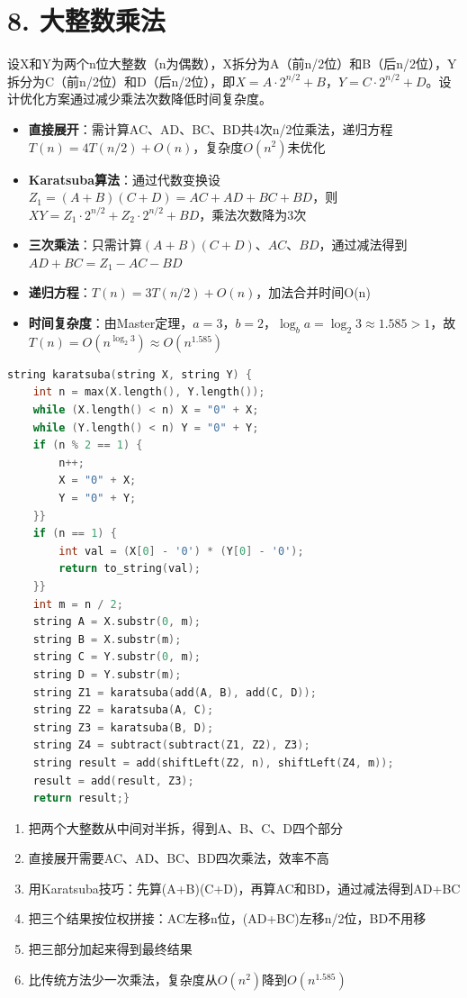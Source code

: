 \section*{8. 大整数乘法}
设X和Y为两个n位大整数（n为偶数），X拆分为A（前n/2位）和B（后n/2位），Y拆分为C（前n/2位）和D（后n/2位），即$X=A \cdot 2^{n/2}+B$，$Y=C \cdot 2^{n/2}+D$。设计优化方案通过减少乘法次数降低时间复杂度。
\begin{itemize}
    \item \textbf{直接展开}：需计算AC、AD、BC、BD共4次n/2位乘法，递归方程$T(n)=4T(n/2)+O(n)$，复杂度$O(n^2)$未优化
    \item \textbf{Karatsuba算法}：通过代数变换设$Z_1=(A+B)(C+D)=AC+AD+BC+BD$，则$XY=Z_1 \cdot 2^{n/2}+Z_2 \cdot 2^{n/2}+BD$，乘法次数降为3次
    \item \textbf{三次乘法}：只需计算$(A+B)(C+D)$、$AC$、$BD$，通过减法得到$AD+BC=Z_1-AC-BD$
    \item \textbf{递归方程}：$T(n)=3T(n/2)+O(n)$，加法合并时间O(n)
    \item \textbf{时间复杂度}：由Master定理，$a=3$，$b=2$，$\log_b a=\log_2 3 \approx 1.585>1$，故$T(n)=O(n^{\log_2 3}) \approx O(n^{1.585})$
\end{itemize}
\begin{lstlisting}[language=C++, style=cppstyle]
string karatsuba(string X, string Y) {
    int n = max(X.length(), Y.length());
    while (X.length() < n) X = "0" + X;
    while (Y.length() < n) Y = "0" + Y;
    if (n % 2 == 1) {
        n++;
        X = "0" + X;
        Y = "0" + Y;
    }}
    if (n == 1) {
        int val = (X[0] - '0') * (Y[0] - '0');
        return to_string(val);
    }}
    int m = n / 2;
    string A = X.substr(0, m);
    string B = X.substr(m);
    string C = Y.substr(0, m);
    string D = Y.substr(m);
    string Z1 = karatsuba(add(A, B), add(C, D));
    string Z2 = karatsuba(A, C);
    string Z3 = karatsuba(B, D);
    string Z4 = subtract(subtract(Z1, Z2), Z3);
    string result = add(shiftLeft(Z2, n), shiftLeft(Z4, m));
    result = add(result, Z3);
    return result;}
\end{lstlisting}

\begin{enumerate}
    \item 把两个大整数从中间对半拆，得到A、B、C、D四个部分
    \item 直接展开需要AC、AD、BC、BD四次乘法，效率不高
    \item 用Karatsuba技巧：先算(A+B)(C+D)，再算AC和BD，通过减法得到AD+BC
    \item 把三个结果按位权拼接：AC左移n位，(AD+BC)左移n/2位，BD不用移
    \item 把三部分加起来得到最终结果
    \item 比传统方法少一次乘法，复杂度从$O(n^2)$降到$O(n^{1.585})$
\end{enumerate}
